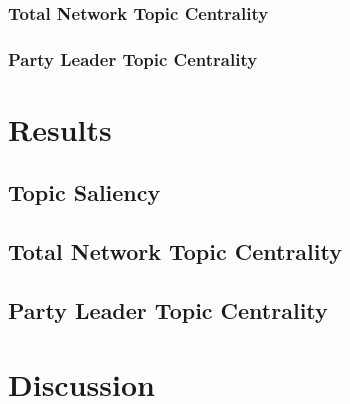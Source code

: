 \documentclass{nws}
\begin{document}
\subsubsection{Total Network Topic Centrality}

\subsubsection{Party Leader Topic Centrality}

\section{Results}

\subsection{Topic Saliency}

\subsection{Total Network Topic Centrality}

\subsection{Party Leader Topic Centrality}

\section{Discussion}




\label{lastpage}
\end{document}
